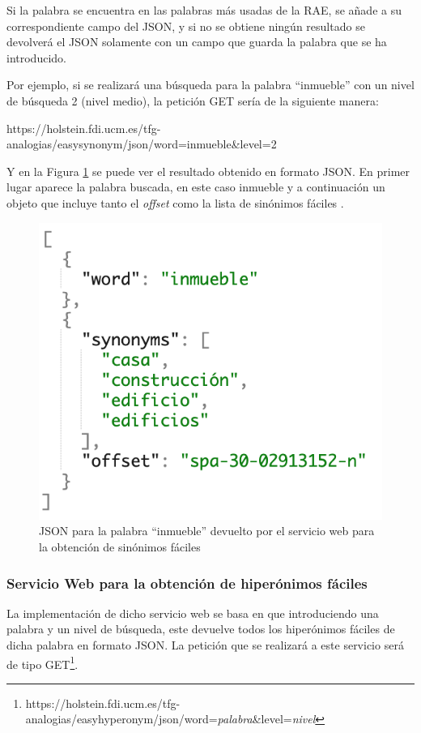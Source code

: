 Si la palabra se encuentra en las palabras más usadas de la RAE, se añade a su correspondiente campo del JSON, y si no se obtiene ningún resultado se devolverá el JSON solamente con un campo que guarda la palabra que se ha introducido.

Por ejemplo, si se realizará una búsqueda para la palabra ``inmueble'' con un nivel de búsqueda 2 (nivel medio), la petición GET sería de la siguiente manera:

https://holstein.fdi.ucm.es/tfg-analogias/easysynonym/json/word=inmueble\&level=2

Y en la Figura \ref{fig:peticionGetEasySynonym} se puede ver el resultado obtenido en formato JSON. En primer lugar aparece la palabra buscada, en este caso inmueble y a continuación un objeto que incluye tanto el \textit{offset} como la lista de sinónimos fáciles .

\begin{figure}[!h]
	\includegraphics[width=.6\textwidth]{Imagenes/Bitmap/Capitulo4/JSON-SW/peticionGetEasySynonym.png}
	\centering
	\caption{JSON  para la palabra ``inmueble'' devuelto por el servicio web para la obtención de sinónimos fáciles}
	\label{fig:peticionGetEasySynonym}
\end{figure}


\subsubsection{Servicio Web para la obtención de hiperónimos fáciles}
\label{cap:subsec:sw_hiperonimosfaciles}
La implementación de dicho servicio web se basa en que introduciendo una palabra y un nivel de búsqueda, este devuelve todos los hiperónimos fáciles de dicha palabra en formato JSON. La petición que se realizará a este servicio será de tipo GET\footnote{https://holstein.fdi.ucm.es/tfg-analogias/easyhyperonym/json/word=\textit{palabra}\&level=\textit{nivel}}.

